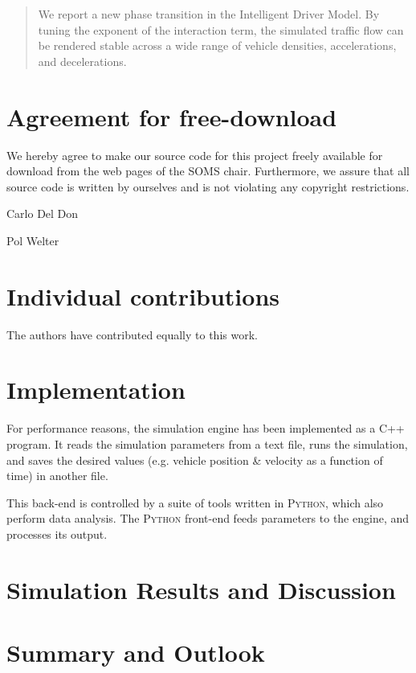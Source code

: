 




\begin{abstract}
We report a new phase transition in the Intelligent Driver Model. By tuning the exponent of the interaction term, the simulated traffic flow can be rendered stable across a wide range of vehicle densities, accelerations, and decelerations.
\end{abstract}
\newpage


\newpage
\section*{Agreement for free-download}
\bigskip\bigskip
\large We hereby agree to make our source code for this project freely available for download from the web pages of the SOMS chair. Furthermore, we assure that all source code is written by ourselves and is not violating any copyright restrictions.

\begin{minipage}[t][2cm][b]{0.45\textwidth}
    \centering Carlo Del Don
\end{minipage}
\begin{minipage}[t][2cm][b]{0.45\textwidth}
    \centering Pol Welter
\end{minipage}

\vspace{5cm}
\section*{Individual contributions}
\bigskip\bigskip
The authors have contributed equally to this work.

\newpage

\tableofcontents

\newpage




\section{Implementation}
For performance reasons, the simulation engine has been implemented as a \textsc{C++} program. It reads the simulation parameters from a text file, runs the simulation, and saves the desired values (e.g. vehicle position \& velocity as a function of time) in another file.

This back-end is controlled by a suite of tools written in \textsc{Python}, which also perform data analysis. The \textsc{Python} front-end feeds parameters to the engine, and processes its output.

\section{Simulation Results and Discussion}

\section{Summary and Outlook}










  



 
